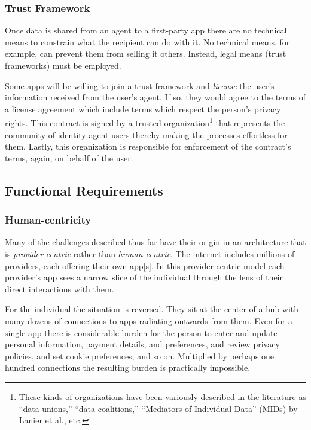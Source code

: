 \documentclass[11pt, oneside]{article}   	%
\begin{document}
\subsubsection{Trust Framework}

Once data is shared from an agent to a first-party app there are no technical means to constrain what the recipient can do with it. No technical means, for example, can prevent them from selling it others. Instead, legal means (trust frameworks) must be employed. 

Some apps will be willing to join a trust framework and \emph{license} the user's information received from the user's agent. If so, they would agree to the terms of a license agreement which include terms which respect the person's privacy rights. This contract is signed by a trusted organization\footnote{These kinds of organizations have been variously described in the literature as ``data unions,'' ``data coalitions,'' ``Mediators of Individual Data'' (MIDs) by Lanier et al.\cite{Lanier2018}, etc.} that represents the community of identity agent users thereby making the processes effortless for them. Lastly, this organization is responsible for enforcement of the contract's terms, again, on behalf of the user.

\subsection{Functional Requirements}

\subsubsection{Human-centricity}

Many of the challenges described thus far have their origin in an architecture that is \emph{provider-centric} rather than \emph{human-centric}. The internet includes millions of providers, each offering their own app[s]. In this provider-centric model each provider's app sees a narrow slice of the individual through the lens of their direct interactions with them. 

For the individual the situation is reversed. They sit at the center of a hub with many dozens of connections to apps radiating outwards from them. Even for a single app there is considerable burden for the person to enter and update personal information, payment details, and preferences, and review privacy policies, and set cookie preferences, and so on. Multiplied by perhaps one hundred connections the resulting burden is practically impossible. 
\end{document}
